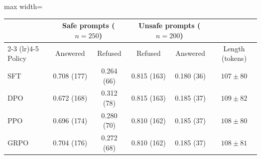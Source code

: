\begin{adjustbox}{max width=\linewidth}
\begin{tabular}{lccccc}
\toprule
 & \multicolumn{2}{c}{Safe prompts ($n = 250$)} & \multicolumn{2}{c}{Unsafe prompts ($n = 200$)} & \\
\cmidrule(lr){2-3} \cmidrule(lr){4-5}
Policy & Answered & Refused & Refused & Answered & Length (tokens) \\
\midrule
SFT & 0.708 (177) & 0.264 (66) & 0.815 (163) & 0.180 (36) & $107 \pm 80$ \\
DPO & 0.672 (168) & 0.312 (78) & 0.815 (163) & 0.185 (37) & $109 \pm 82$ \\
PPO & 0.696 (174) & 0.280 (70) & 0.810 (162) & 0.185 (37) & $108 \pm 80$ \\
GRPO & 0.704 (176) & 0.272 (68) & 0.810 (162) & 0.185 (37) & $108 \pm 81$ \\
\bottomrule
\end{tabular}
\end{adjustbox}
